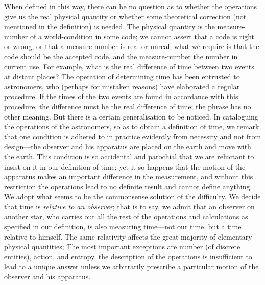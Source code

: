 \documentclass[12pt]{book}
\begin{document}
When defined in this way, there can be no question as to whether the
operations give us the real physical quantity or whether some theoretical
correction (not mentioned in the definition) is needed. The physical quantity
is the measure-number of a world-condition in some code; we cannot assert
that a code is right or wrong, or that a measure-number is real or unreal;
what we require is that the code should be the accepted code, and the measure-number
the number in current use. For example, what is the real difference
of time between two events at distant places? The operation of determining
time has been entrusted to astronomers, who (perhaps for mistaken reasons)
have elaborated a regular procedure. If the times of the two events are found
in accordance with this procedure, the difference must be the real difference
of time; the phrase has no other meaning. But there is a certain generalisation
to be noticed. In cataloguing the operations of the astronomers, so as to
obtain a definition of time, we remark that one condition is adhered to in
practice evidently from necessity and not from design---the observer and his
apparatus are placed on the earth and move with the earth. This condition
is so accidental and parochial that we are reluctant to insist on it in our
definition of time; yet it so happens that the motion of the apparatus makes
an important difference in the measurement, and without this restriction the
operations lead to no definite result and cannot define anything. We adopt
what seems to be the commonsense solution of the difficulty. We decide that
time is \emph{relative to an observer}; that is to say, we admit that an observer on
another star, who carries out all the rest of the operations and calculations
as specified in our definition, is also measuring time---not our time, but a
time relative to himself. The same relativity affects the great majority of
elementary physical quantities\footnotemark;\footnotetext
  {The most important exceptions are number (of discrete entities), action, and entropy.}
the description of the operations is insufficient
to lead to a unique answer unless we arbitrarily prescribe a particular
motion of the observer and his apparatus.
\end{document}
